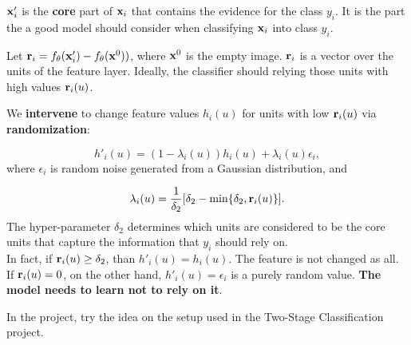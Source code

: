 \documentclass[12pt,a4paper]{article}
\begin{document}
    ${\bf x}'_i$ is the {\bf core} part of ${\bf x}_i$ that contains the evidence for the class $y_i$. It is the part the a good model should consider when classifying ${\bf x}_i$ into class $y_i$.

\item Let ${\bf r}_i  = f_{\theta}({\bf x}'_i) - f_{\theta}({\bf x}^0))$, where  ${\bf x}^0$ is the empty image. ${\bf r}_i$ is a vector over the units of the feature layer. Ideally, the classifier should relying those units
    with high values ${\bf r}_i(u)$.

\item We {\bf intervene} to change feature values $h_i(u)$ for units with low  ${\bf r}_i(u)$ via {\bf randomization}:

     \[h'_i(u) = (1 - \lambda_i(u)) h_i(u) + \lambda_i(u) \epsilon_i,\]
     where $\epsilon_i$ is random noise generated from a Gaussian distribution, and

  \[ \lambda_i(u)   = \frac{1}{\delta_2} [\delta_2 - \min\{\delta_2, {\bf r}_i(u)\}].\]
     The hyper-parameter $\delta_2$ determines which units are considered to be the core units that capture the information that $y_i$ should rely on.  \\

     In fact, if ${\bf r}_i(u) \geq \delta_2$,
     than $h'_i(u) = h_i(u)$.  The feature is not changed as all. If  ${\bf r}_i(u) =0$, on the other hand,
      $h'_i(u) =  \epsilon_i$ is a purely random value.  {\bf The model needs to learn not to rely on it}.


\eit


In the project, try the idea on the setup used in the Two-Stage Classification project.
\end{document}
